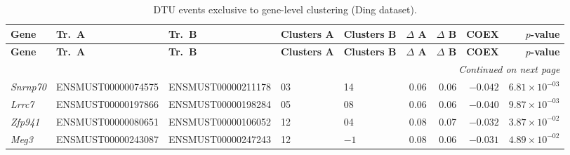 \begin{landscape}
\begingroup
\setlength{\tabcolsep}{3.5pt}
\begin{longtable}{@{} l l l p{2.8cm} p{2.8cm} r r r r @{}}
\caption{DTU events exclusive to gene-level clustering (Ding dataset).\label{tab:exc2_landscape}}\\
\toprule
\textbf{Gene} & \textbf{Tr.~A} & \textbf{Tr.~B} & \textbf{Clusters A} & \textbf{Clusters B} & \textbf{$\Delta$ A} & \textbf{$\Delta$ B} & \textbf{COEX} & \textbf{$p$-value} \\
\midrule
\endfirsthead
\toprule
\textbf{Gene} & \textbf{Tr.~A} & \textbf{Tr.~B} & \textbf{Clusters A} & \textbf{Clusters B} & \textbf{$\Delta$ A} & \textbf{$\Delta$ B} & \textbf{COEX} & \textbf{$p$-value} \\
\midrule
\endhead
\midrule
\multicolumn{9}{r}{\textit{Continued on next page}} \\
\endfoot
\bottomrule
\endlastfoot
\textit{Snrnp70} & ENSMUST00000074575 & ENSMUST00000211178 & 03 & 14 & 0.06 & 0.06 & $-0.042$ & $6.81 \times 10^{-03}$ \\
\textit{Lrrc7}   & ENSMUST00000197866 & ENSMUST00000198284 & 05 & 08 & 0.06 & 0.06 & $-0.040$ & $9.87 \times 10^{-03}$ \\
\textit{Zfp941}  & ENSMUST00000080651 & ENSMUST00000106052 & 12 & 04 & 0.08 & 0.07 & $-0.032$ & $3.87 \times 10^{-02}$ \\
\textit{Meg3}    & ENSMUST00000243087 & ENSMUST00000247243 & 12 & $-1$ & 0.08 & 0.06 & $-0.031$ & $4.89 \times 10^{-02}$ \\
\end{longtable}
\endgroup
\end{landscape}